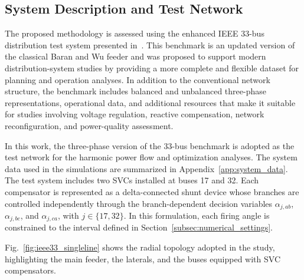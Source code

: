 \documentclass[journal]{IEEEtran}
\begin{document}
\subsection{System Description and Test Network}
\label{subsec:system}

The proposed methodology is assessed using the enhanced IEEE 33-bus
distribution test system presented in~\cite{dolatabadi2021}. This benchmark
is an updated version of the classical Baran and Wu feeder and was proposed
to support modern distribution-system studies by providing a more complete
and flexible dataset for planning and operation analyses. In addition to the
conventional network structure, the benchmark includes balanced and
unbalanced three-phase representations, operational data, and additional
resources that make it suitable for studies involving voltage regulation,
reactive compensation, network reconfiguration, and power-quality
assessment.

In this work, the three-phase version of the 33-bus benchmark is adopted as
the test network for the harmonic power flow and optimization analyses. The
system data used in the simulations are
summarized in Appendix~\ref{app:system_data}. The test system includes two
 SVCs installed at buses 17 and 32. Each compensator is represented
as a delta-connected shunt device whose branches are controlled independently
through the branch-dependent decision variables
$\alpha_{j,ab}$, $\alpha_{j,bc}$, and $\alpha_{j,ca}$, with
$j \in \{17,32\}$. In this formulation, each firing angle is constrained to
the interval defined in Section~\ref{subsec:numerical_settings}.

Fig.~\ref{fig:ieee33_singleline} shows the radial topology adopted in the
study, highlighting the main feeder, the laterals, and the buses equipped
with SVC compensators.
\end{document}
